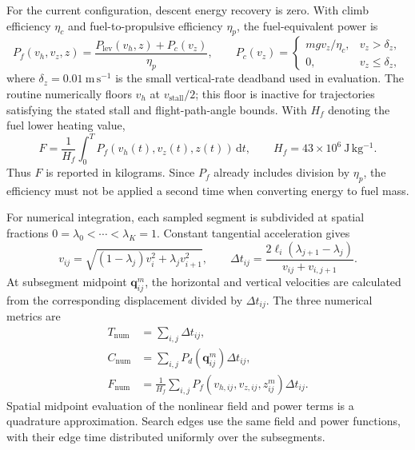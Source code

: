 \documentclass[preprint,12pt]{elsarticle}
\begin{document}
For the current configuration, descent energy recovery is zero. With
climb efficiency $\eta_c$ and fuel-to-propulsive efficiency $\eta_p$,
the fuel-equivalent power is
\begin{equation}
 P_f(v_h,v_z,z)=\frac{P_{\mathrm{lev}}(v_h,z)+P_c(v_z)}{\eta_p},
 \qquad
 P_c(v_z)=
 \begin{cases}
  mgv_z/\eta_c, & v_z>\delta_z,\\
  0, & v_z\le\delta_z,
 \end{cases}
 \label{pr:eq:fuelpower}
\end{equation}
where $\delta_z=0.01~\mathrm{m\,s^{-1}}$ is the small vertical-rate
deadband used in evaluation. The routine numerically floors $v_h$ at
$v_{\mathrm{stall}}/2$; this floor is inactive for trajectories satisfying
the stated stall and flight-path-angle bounds. With $H_f$ denoting the fuel
lower heating value,
\begin{equation}
 F=\frac{1}{H_f}\int_0^T
 P_f(v_h(t),v_z(t),z(t))\,\mathrm{d}t,
 \qquad H_f=43\times10^6~\mathrm{J\,kg^{-1}}.
 \label{pr:eq:fuel}
\end{equation}
Thus $F$ is reported in kilograms. Since $P_f$ already includes division
by $\eta_p$, the efficiency must not be applied a second time when
converting energy to fuel mass.

For numerical integration, each sampled segment is subdivided at spatial
fractions $0=\lambda_0<\cdots<\lambda_K=1$. Constant tangential acceleration
gives
\begin{equation}
 v_{ij}=\sqrt{(1-\lambda_j)v_i^2+\lambda_j v_{i+1}^2},\qquad
 \Delta t_{ij}=\frac{2\ell_i(\lambda_{j+1}-\lambda_j)}{v_{ij}+v_{i,j+1}}.
 \label{pr:eq:subtime}
\end{equation}
At subsegment midpoint $\mathbf{q}_{ij}^{m}$, the horizontal and vertical
velocities are calculated from the corresponding displacement divided by
$\Delta t_{ij}$. The three numerical metrics are
\begin{equation}
 \begin{aligned}
 T_{\mathrm{num}}&=\sum_{i,j}\Delta t_{ij},\\
 C_{\mathrm{num}}&=\sum_{i,j}P_d(\mathbf{q}_{ij}^{m})\Delta t_{ij},\\
 F_{\mathrm{num}}&=\frac{1}{H_f}\sum_{i,j}
 P_f(v_{h,ij},v_{z,ij},z_{ij}^{m})\Delta t_{ij}.
 \end{aligned}
 \label{pr:eq:quadrature}
\end{equation}
Spatial midpoint evaluation of the nonlinear field and power terms is a
quadrature approximation. Search edges use the same field and power
functions, with their edge time distributed uniformly over the subsegments.
\end{document}
